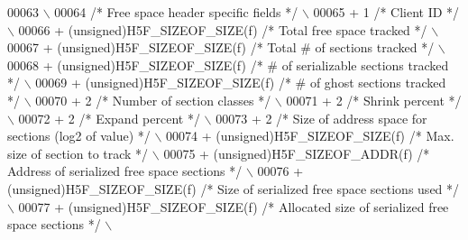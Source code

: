 \begin{DoxyCode}
00063 \textcolor{preprocessor}{                                                                              \(\backslash\)}
00064 \textcolor{preprocessor}{    }\textcolor{comment}{/* Free space header specific fields */}\textcolor{preprocessor}{                                   \(\backslash\)}
00065 \textcolor{preprocessor}{    + 1 }\textcolor{comment}{/* Client ID */}\textcolor{preprocessor}{                                                       \(\backslash\)}
00066 \textcolor{preprocessor}{    + (unsigned)H5F\_SIZEOF\_SIZE(f) }\textcolor{comment}{/* Total free space tracked */}\textcolor{preprocessor}{                       \(\backslash\)}
00067 \textcolor{preprocessor}{    + (unsigned)H5F\_SIZEOF\_SIZE(f) }\textcolor{comment}{/* Total # of sections tracked */}\textcolor{preprocessor}{                    \(\backslash\)}
00068 \textcolor{preprocessor}{    + (unsigned)H5F\_SIZEOF\_SIZE(f) }\textcolor{comment}{/* # of serializable sections tracked */}\textcolor{preprocessor}{             \(\backslash\)}
00069 \textcolor{preprocessor}{    + (unsigned)H5F\_SIZEOF\_SIZE(f) }\textcolor{comment}{/* # of ghost sections tracked */}\textcolor{preprocessor}{                    \(\backslash\)}
00070 \textcolor{preprocessor}{    + 2 }\textcolor{comment}{/* Number of section classes */}\textcolor{preprocessor}{                                       \(\backslash\)}
00071 \textcolor{preprocessor}{    + 2 }\textcolor{comment}{/* Shrink percent */}\textcolor{preprocessor}{                                                  \(\backslash\)}
00072 \textcolor{preprocessor}{    + 2 }\textcolor{comment}{/* Expand percent */}\textcolor{preprocessor}{                                                  \(\backslash\)}
00073 \textcolor{preprocessor}{    + 2 }\textcolor{comment}{/* Size of address space for sections (log2 of value) */}\textcolor{preprocessor}{              \(\backslash\)}
00074 \textcolor{preprocessor}{    + (unsigned)H5F\_SIZEOF\_SIZE(f) }\textcolor{comment}{/* Max. size of section to track */}\textcolor{preprocessor}{                  \(\backslash\)}
00075 \textcolor{preprocessor}{    + (unsigned)H5F\_SIZEOF\_ADDR(f) }\textcolor{comment}{/* Address of serialized free space sections */}\textcolor{preprocessor}{      \(\backslash\)}
00076 \textcolor{preprocessor}{    + (unsigned)H5F\_SIZEOF\_SIZE(f) }\textcolor{comment}{/* Size of serialized free space sections used */}\textcolor{preprocessor}{    \(\backslash\)}
00077 \textcolor{preprocessor}{    + (unsigned)H5F\_SIZEOF\_SIZE(f) }\textcolor{comment}{/* Allocated size of serialized free space sections */}\textcolor{preprocessor}{ \(\backslash\)}

\end{DoxyCode}
